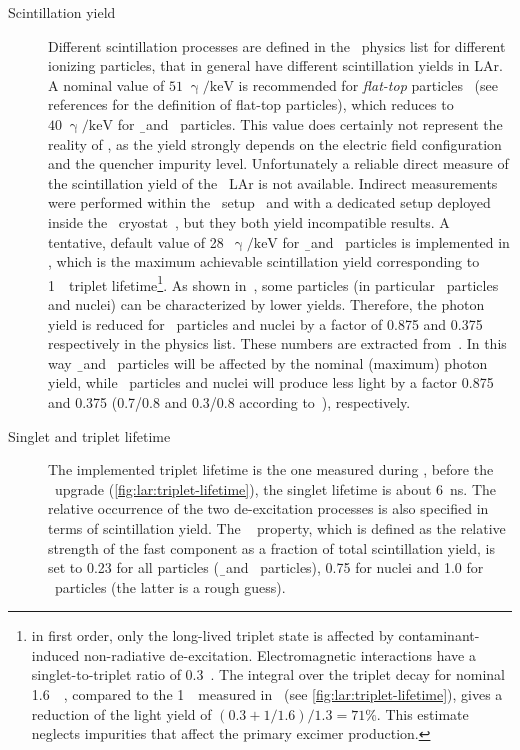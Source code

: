 \begin{description}
  \item[Scintillation yield] Different scintillation processes are defined in the \mage\
    physics list for different ionizing particles, that in general have different
    scintillation yields in LAr. A nominal value of $51\;\upgamma/\text{keV}$ is
    recommended for \emph{flat-top} particles~\cite{Doke2002, Doke1988} (see references for
    the definition of flat-top particles), which reduces to $40\;\upgamma/\text{keV}$ for
    \b\ and \g\ particles. This value does certainly not represent the reality of \gerda,
    as the yield strongly depends on the electric field configuration and the quencher
    impurity level. Unfortunately a reliable direct measure of the scintillation yield of
    the \gerda\ LAr is not available. Indirect measurements were performed within the
    \LArGe\ setup~\cite{Lehnert2016} and with a dedicated setup deployed inside the
    \gerda\ cryostat~\cite{Barros2020}, but they both yield incompatible results. A
    tentative, default value of 28~$\upgamma/\text{keV}$ for \b\ and \g\ particles is
    implemented in \mage, which is the maximum achievable scintillation yield
    corresponding to 1~\mus\ triplet lifetime\footnote{%
      in first order, only the long-lived triplet state is affected by contaminant-induced
      non-radiative de-excitation. Electromagnetic interactions have a singlet-to-triplet
      ratio of 0.3~\cite{Doke2002}. The integral over the triplet decay for nominal
      1.6~\mus~\cite{Doke2002}, compared to the 1~\mus\ measured in \gerda\ (see
      \cref{fig:lar:triplet-lifetime}), gives a reduction of the light yield of $(0.3 +
      1/1.6)/1.3 = 71\%$. This estimate neglects impurities that affect the primary
      excimer production.
    }.
    As shown in~\cite{Doke2002}, some particles (in particular \a\ particles and nuclei)
    can be characterized by lower yields. Therefore, the photon yield is reduced for \a\
    particles and nuclei by a factor of 0.875 and 0.375 respectively in the physics list.
    These numbers are extracted from~\cite{Doke2002}. In this way \b\ and \g\ particles
    will be affected by the nominal (maximum) photon yield, while \a\ particles and nuclei
    will produce less light by a factor 0.875 and 0.375 (0.7/0.8 and 0.3/0.8 according
    to~\cite{Doke2002}), respectively.

  \item[Singlet and triplet lifetime] \sloppy The implemented triplet lifetime is the one
    measured during \gerdatwo, before the \phasetwop\ upgrade
    (\cref{fig:lar:triplet-lifetime}), the singlet lifetime is about 6~ns. The relative
    occurrence of the two de-excitation processes is also specified in terms of
    scintillation yield. The \geant\ \m{YIELDRATIO} property, which is defined as the
    relative strength of the fast component as a fraction of total scintillation yield, is
    set to 0.23 for all particles (\b{}nd \g\ particles), 0.75 for nuclei and 1.0 for \a\
    particles (the latter is a rough guess).


\end{description}
